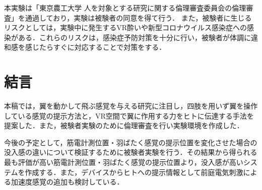 \begin{small}
  本実験は「東京農工大学 人を対象とする研究に関する倫理審査委員会の倫理審査」を通過しており，実験は被験者の同意を得て行う．
  また，被験者に生じるリスクとしては，実験中に発生するVR酔いや新型コロナウイルス感染症への感染がある．これらのリスクは，感染症予防対策を十分に行い，被験者が体調に違和感を感じたらすぐに対応することで対策をする．
  



\section{結言}
  本稿では，翼を動かして飛ぶ感覚を与える研究に注目し，四肢を用いず翼を操作している感覚の提示方法と，VR空間で翼に作用する力をヒトに伝達する手法を提案した．また，被験者実験のために倫理審査を行い実験環境を作成した．

  今後の予定として，筋電計測位置・羽ばたく感覚の提示位置を変化させた場合の没入感の違いについて検証するために被験者実験を行う．その結果から得られる最も評価が高い筋電計測位置・羽ばたく感覚の提示位置より，没入感が高いシステムを作成する．また，デバイスからヒトへの提示情報として前庭電気刺激による加速度感覚\cite{青山一真2014前庭電気刺激における逆方向不感電流を用いた加速度感覚の増強}の追加も検討している．


{
\small
 \setlength{\kanjiskip}{0.0zw plus.01zw} %
 \setlength{\baselineskip}{9pt}        %
 \setlength{\itemsep}{0.2pt}             %
 \setlength{\lineskip}{0pt}              %


}



\end{small}

